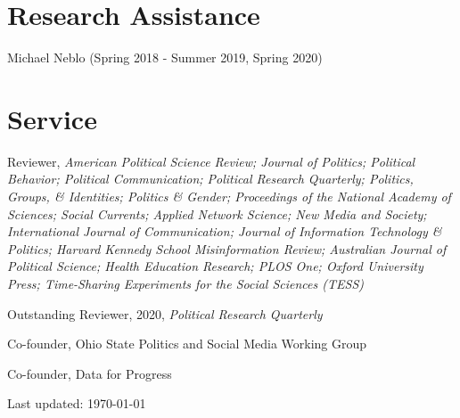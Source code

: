 \documentclass[letterpaper]{article}
\renewenvironment{itemize}{
  \begin{list}{}{
    \setlength{\leftmargin}{1.5em}
  }
}{
  \end{list}
}
\begin{document}
\section*{Research Assistance}
\begin{itemize}
\item  Michael Neblo (Spring 2018 - Summer 2019, Spring 2020)
\end{itemize}

\section*{Service}

\begin{itemize}
\item Reviewer, \textit{American Political Science Review; Journal of Politics; Political Behavior; Political Communication; Political Research Quarterly; Politics, Groups, \& Identities; Politics \& Gender; Proceedings of the National Academy of Sciences; Social Currents; Applied Network Science; New Media and Society; International Journal of Communication; Journal of Information Technology \& Politics; Harvard Kennedy School Misinformation Review; Australian Journal of Political Science; Health Education Research; PLOS One; Oxford University Press; Time-Sharing Experiments for the Social Sciences (TESS)}
\begin{itemize}
Outstanding Reviewer, 2020, \textit{Political Research Quarterly}
\end{itemize}
\item Co-founder, Ohio State Politics and Social Media Working Group
\item Co-founder, Data for Progress
\end{itemize}

\begin{center}
  \begin{footnotesize}
    Last updated: \today
      \end{footnotesize}
\end{center}
\end{document}
